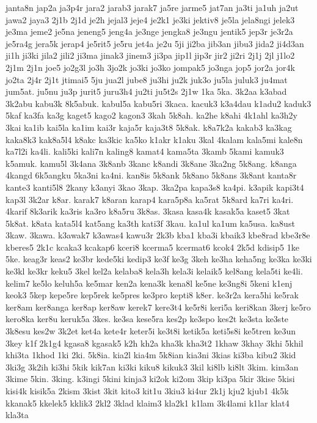 {janta8n jap2a ja3p4r jara2 jarab3 jarak7 ja5re jarme5 jat7an ja3ti ja1uh
ja2ut jawa2 jaya3 2j1b 2j1d je2h jejal3 jeje4 je2k1 je3ki jektiv8 je5la
jela8ngi jelek3 je3ma jeme2 je5na jeneng5 jeng4a je3nge jengka8 je3ngu
jentik5 jep3r je3r2a je5ra4g jera5k jerap4 je5rit5 je5ru jet4a je2u 5ji
ji2ba jib3an jibu3 jida2 ji4d3an ji1h ji3ki jila2 jili2 ji3ma jinak3
jinem3 ji3pa jip1l jip3r jir2 ji2ri 2j1j 2jl j1lo2 2j1m 2j1n joe5 jo2g3l
jo3h 3jo2k jo3ki jo3ko jompak5 jo3nga jop5 jor2a jor4k jo2ta 2j4r 2j1t
jtimai5 5ju jua2l jube8 ju3hi ju2k juk3o ju5la juluk3 ju4mat jum5at. ju5nu
ju3p jurit5 juru3h4 ju2ti ju5t2s 2j1w 1ka 5ka. 3k2aa k3abad 3k2abu kabu3k
8k5abuk. kabul5a kabu5ri 3kaca. kacuk3 k3a4dau k1adu2 kaduk3 5kaf ka3fa
ka3g kaget5 kago2 kagon3 3kah 5k8ah. ka2he k8ahi 4k1ahl ka3h2y 3kai ka1ib
kai5la ka1im kai3r kaja5r kaja3t8 5k8ak. k8a7k2a kakab3 ka3kag kaka8k3
kak8a5l4 k8akc ka3kic ka5ko k1akr k1aku 3kal 4kalam kala5mi kale8n ka7l2i
ka4li. kali5ki kali7n kaling8 kamat4 kama5ta 3kamb 5kami kamuk3 k5amuk.
kamu5l 3k4ana 3k8anb 3kanc k8andi 3k8ane 3ka2ng 5k8ang. k8anga 4kangd
6k5angku 5ka3ni ka4ni. kan8is 5k8ank 5k8ano 5k8ans 3k8ant kanta8r kante3
kanti5l8 2kany k3anyi 3kao 3kap. 3ka2pa kapa3s8 ka4pi. k3apik kapi3t4
kap3l 3k2ar k8ar. karak7 k8aran karap4 kara5p8a ka5rat 5k8ard ka7ri ka4ri.
4karif 8k3arik ka3ris ka3ro k8a5ru 3k8as. 3kasa kasa4k kasak5a kaset5 3kat
5k8at. k8ata kata5l4 kat5ang ka3th kati3f 3kau. ka1ul ka1um ka5usa. ka8ust
3kaw. 3kawa. k3awak7 k3awas4 kawu3r 2k3b kba1 kba3i kbaik3 kbe8rad kbe3r8e
kberes5 2k1c kcaka3 kcakap6 kceri8 kcerma5 kcermat6 kcok4 2k5d kdisip5 1ke
5ke. keag3r keas2 ke3br kede5ki kedip3 ke3f ke3g 3keh ke3ha keha5ng ke3ka
ke3ki ke3kl ke3kr keku5 3kel kel2a kelaba8 kela3h kela3i kelaik5 kel8ang
kela5ti ke4li. kelim7 ke5lo keluh5a ke5mar ken2a kena3k kena8l ke5ne
ke3ng8i 5keni k1enj keok3 5kep kepe5re kep5rek ke5pres ke3pro kepti8 k8er.
ke3r2a kera5hi ke5rak ker8am ker8anga ker8ap ker8aw kerek7 kere3t4 ke5r8i
keri5a keri8kan 3kerj ke5ro kero8ka ker8u keruk5a 3kes. ke3sa kese5ra
kes2p ke3spo kes2t ke3sta ke3ste 3k8esu kes2w 3k2et ket4a kete4r keter5i
ke3t8i ketik5a keti5s8i ke5tren ke3un 3key k1f 2k1g4 kgasa8 kgasak5 k2h
kh2a kha3k kha3t2 1khaw 3khay 3khi 5khil khi3ta 1khod 1ki 2ki. 5k8ia.
kia2l kia4m 5k8ian kia3ni 3kias ki3ba kibu2 3kid 3ki3g 3k2ih ki3hi 5kik
kik7an ki3ki kiku8 kikuk3 3kil ki8lb ki8lt 3kim. kim3an 3kime 5kin. 3king.
k3ingi 5kini kinja3 ki2ok ki2om 3kip ki3pa 5kir 3kise 5kisi kisi4k kisik5a
2kism 3kist 3kit kito3 kit1u 3kiu3 ki4ur 2k1j kju2 kjub1 4k5k kkanak5
kkelek5 kklik3 2kl2 3klad klaim3 kla2k1 k1lam 3k4lami k1lar klat4 kla3ta
}
